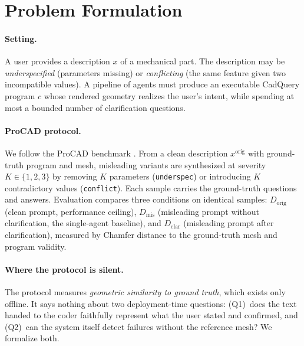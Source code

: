 \section{Problem Formulation}\label{sec:formulation}

\paragraph{Setting.}
A user provides a description $x$ of a mechanical part. The description may
be \emph{underspecified} (parameters missing) or \emph{conflicting} (the same
feature given two incompatible values). A pipeline of agents must produce an
executable CadQuery program $c$ whose rendered geometry realizes the user's
intent, while spending at most a bounded number of clarification questions.

\paragraph{ProCAD protocol.}
We follow the ProCAD benchmark \cite{procad}. From a clean description
$x^\mathrm{orig}$ with ground-truth program and mesh, misleading variants are
synthesized at severity $K{\in}\{1,2,3\}$ by removing $K$ parameters
(\texttt{underspec}) or introducing $K$ contradictory values
(\texttt{conflict}). Each sample carries the ground-truth questions and
answers. Evaluation compares three conditions on identical samples:
$D_\mathrm{orig}$ (clean prompt, performance ceiling), $D_\mathrm{mis}$
(misleading prompt without clarification, the single-agent baseline), and
$D_\mathrm{clar}$ (misleading prompt after clarification), measured by
Chamfer distance to the ground-truth mesh and program validity.

\paragraph{Where the protocol is silent.}
The protocol measures \emph{geometric similarity to ground truth}, which
exists only offline. It says nothing about two deployment-time questions:
(Q1)~does the text handed to the coder faithfully represent what the user
stated and confirmed, and (Q2)~can the system itself detect failures without
the reference mesh? We formalize both.

